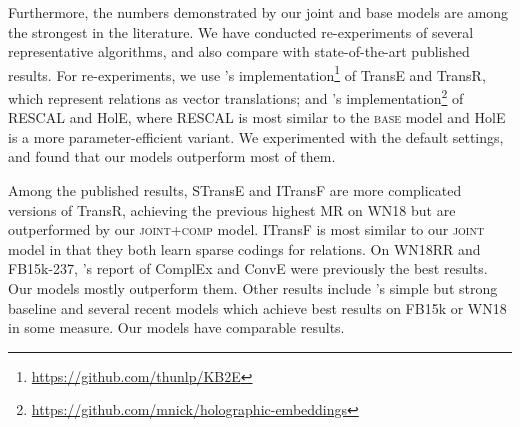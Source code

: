\documentclass[11pt,a4paper]{article}
\begin{document}

Furthermore, the numbers demonstrated by our joint and base models are among 
the strongest in the literature. We have conducted re-experiments of several representative 
algorithms, and also compare with state-of-the-art published results. 
For re-experiments, we use \citet{DBLP:conf/aaai/LinLSLZ15}'s 
implementation\footnote{\url{https://github.com/thunlp/KB2E}} of 
TransE \citep{DBLP:conf/nips/BordesUGWY13} and TransR, 
which represent relations as vector translations; and \citet{DBLP:conf/aaai/NickelRP16}'s 
implementation\footnote{\url{https://github.com/mnick/holographic-embeddings}} of 
RESCAL \citep{Nickel:2011:TMC:3104482.3104584} and HolE, where RESCAL is most similar to 
the \textsc{base} model and HolE is a more parameter-efficient variant. We experimented with the default settings, 
and found that our models outperform most of them. 

Among the published results, STransE \citep{nguyen-EtAl:2016:N16-1} and ITransF \citep{xie-EtAl:2017:Long} are more complicated versions of TransR, achieving the previous highest MR on WN18 
but are outperformed by our \textsc{joint+comp} model. ITransF is most similar to 
our \textsc{joint} model in that they both learn sparse codings for relations. 
On WN18RR and FB15k-237, \citet{dettmers2018conve}'s report of 
ComplEx \citep{DBLP:conf/icml/TrouillonWRGB16} and ConvE were previously the best results. 
Our models mostly outperform them. 
Other results 
include \citet{kadlec-bajgar-kleindienst:2017:RepL4NLP}'s simple but strong baseline and several recent 
models 
\citep{DBLP:journals/corr/SchlichtkrullKB17,DBLP:conf/aaai/ShiW17,shen-EtAl:2017:RepL4NLP1} which achieve best results on FB15k or WN18 in some measure. Our models have comparable results. 







\end{document}
